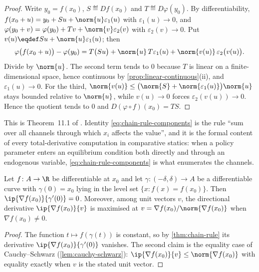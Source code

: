 \begin{proof}
	Write $y_0=f(x_0)$, $S\eqdef Df(x_0)$ and $T\eqdef D\varphi(y_0)$. By
	differentiability,
	$f(x_0+u)=y_0+Su+\norm{u}\varepsilon_1(u)$ with $\varepsilon_1(u)\to0$, and
	$\varphi(y_0+v)=\varphi(y_0)+Tv+\norm{v}\varepsilon_2(v)$ with
	$\varepsilon_2(v)\to0$. Put $v(u)\eqdef Su+\norm{u}\varepsilon_1(u)$; then
	\[
		\varphi\bigl(f(x_0+u)\bigr)-\varphi(y_0)
		=T\bigl(Su\bigr)+\norm{u}\,T\varepsilon_1(u)
		+\norm{v(u)}\,\varepsilon_2\bigl(v(u)\bigr).
	\]
	Divide by $\norm{u}$. The second term tends to $0$ because $T$ is linear on a
	finite-dimensional space, hence continuous by
	\autoref{prop:linear-continuous}(ii), and $\varepsilon_1(u)\to0$. For the
	third, $\norm{v(u)}\leq\bigl(\norm{S}+\norm{\varepsilon_1(u)}\bigr)\norm{u}$
	stays bounded relative to $\norm{u}$, while $v(u)\to0$ forces
	$\varepsilon_2(v(u))\to0$. Hence the quotient tends to $0$ and
	$D(\varphi\circ f)(x_0)=TS$.
\end{proof}

This is Theorem~11.1 of \textcite[p.~380]{fukuda2026notes}. Identity
\eqref{eq:chain-rule-components} is the rule ``sum over all channels through
which $x_i$ affects the value'', and it is the formal content of every
total-derivative computation in comparative statics: when a policy parameter
enters an equilibrium condition both directly and through an endogenous variable,
\eqref{eq:chain-rule-components} is what enumerates the channels.

\begin{proposition}\label{prop:gradient-level-set}
	Let $f\colon A\to\R$ be differentiable at $x_0$ and let
	$\gamma\colon(-\delta,\delta)\to A$ be a differentiable curve with
	$\gamma(0)=x_0$ lying in the level set $\{x : f(x)=f(x_0)\}$. Then
	$\ip{\nabla f(x_0)}{\gamma'(0)}=0$. Moreover, among unit vectors $v$, the
	directional derivative $\ip{\nabla f(x_0)}{v}$ is maximised at
	$v=\nabla f(x_0)/\norm{\nabla f(x_0)}$ when $\nabla f(x_0)\neq0$.
\end{proposition}

\begin{proof}
	The function $t\mapsto f(\gamma(t))$ is constant, so by
	\autoref{thm:chain-rule} its derivative
	$\ip{\nabla f(x_0)}{\gamma'(0)}$ vanishes. The second claim is the equality case
	of Cauchy--Schwarz (\autoref{lem:cauchy-schwarz}):
	$\ip{\nabla f(x_0)}{v}\leq\norm{\nabla f(x_0)}$ with equality exactly when $v$
	is the stated unit vector.
\end{proof}

